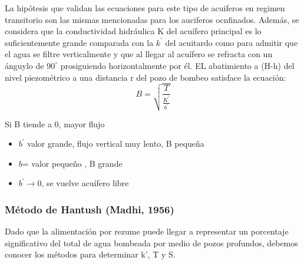 La hipótesis que validan las ecuaciones para este tipo de acuiferos en regimen transitorio son las mismas mencionadas para los auciferos ocnfinados. Además, se considera que la conductividad hidráulica K del acuífero principal es lo suficientemente grande comparada con la $k^{\prime}$ del acuitardo como para admitir que el agua se filtre verticalmente y que al llegar al acuífero se refracta con un ánguylo de $90^{\circ}$ prosiguiendo horizontalmente por él. EL abatimiento a (H-h) del nivel piezométrico a una distancia r del pozo de bombeo satisface la ecuación:
\begin{equation}
    B = \sqrt{\frac{T}{\frac{K^{\prime}}{b^{\prime}} }}
\end{equation}
\begin{notation}
    Si B tiende a 0, mayor flujo \begin{itemize}
        \item $b^{\prime}$ valor grande, flujo vertical muy lento, B pequeña
        \item $b$= valor pequeño , B grande
        \item $b^{\prime}\to 0$, se vuelve acuífero libre
    \end{itemize}
\end{notation}
\subsubsection{Método de Hantush (Madhi, 1956)}
Dado que la alimentación por rezume puede llegar a representar un porcentaje significativo del total de agua bombeada por medio de pozos profundos, debemos conocer los métodos para determinar k', T y S.

